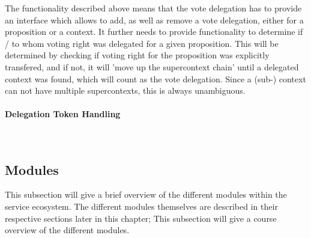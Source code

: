 The functionality described above means that the vote delegation has to provide an interface which allows to add, as well as remove a vote delegation, either for a proposition or a context. It further needs to provide functionality to determine if / to whom voting right was delegated for a given proposition. This will be determined by checking if voting right for the proposition was explicitly transfered, and if not, it will 'move up the supercontext chain' until a delegated context was found, which will count as the vote delegation. Since a (sub-) context  can not have multiple supercontexts, this is always unambiguous.

\paragraph*{Delegation Token Handling} \mbox{} \\


\subsection{Modules}
% 
% 
% 
% 
%
\label{ssec:Modules}
This subsection will give a brief overview of the different modules within the service ecosystem. The different modules themselves are described in their respective sections later in this chapter; This subsection will give a course overview of the different modules.

